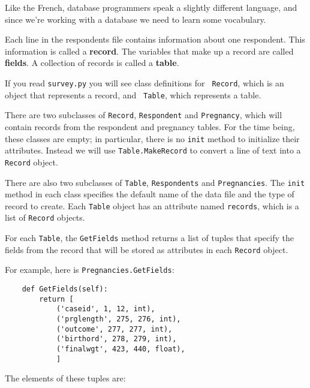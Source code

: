 \documentclass[10pt]{book}
\begin{document}
Like the French, database programmers speak a slightly
different language, and since we're working with a database we need
to learn some vocabulary.

Each line in the respondents file contains information about one
respondent.  This information is called a {\bf record}.  The
variables that make up a record are called {\bf fields}.  A
collection of records is called a {\bf table}.

If you read {\tt survey.py} you will see class definitions for {\tt
  Record}, which is an object that represents a record, and {\tt
  Table}, which represents a table.

There are two subclasses of
{\tt Record}, {\tt Respondent} and {\tt Pregnancy}, which will
contain records from the respondent and pregnancy tables.
For the time being, these classes are empty; in particular, there
is no {\tt init} method to initialize their attributes.  Instead
we will use {\tt Table.MakeRecord} to convert a line of text into
a {\tt Record} object.

There are also two subclasses of {\tt Table}, {\tt Respondents}
and {\tt Pregnancies}.  The {\tt init} method in each class
specifies the default name of the data file and the type of
record to create.  Each {\tt Table} object has an attribute
named {\tt records}, which is a list of {\tt Record} objects.

For each {\tt Table}, the {\tt GetFields} method returns
a list of tuples that specify the fields from the record that
will be stored as attributes in each {\tt Record} object.

For example, here is {\tt Pregnancies.GetFields}:

\begin{verbatim}
    def GetFields(self):
        return [
            ('caseid', 1, 12, int),
            ('prglength', 275, 276, int),
            ('outcome', 277, 277, int),
            ('birthord', 278, 279, int),
            ('finalwgt', 423, 440, float),
            ]
\end{verbatim}

The elements of these tuples are:
\end{document}
